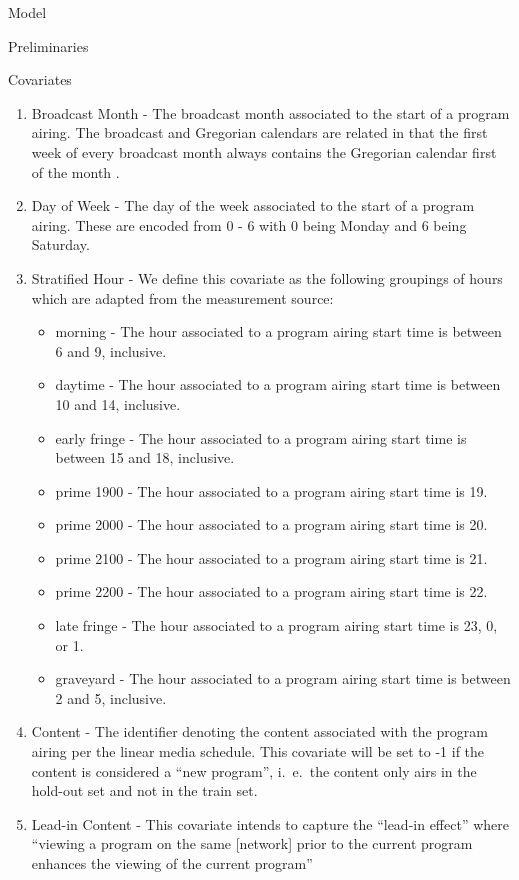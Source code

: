 \begin{chapter}{Model}
\begin{section}{Preliminaries}
\begin{subsection}{Covariates}
    \begin{enumerate}
    \item Broadcast Month - The broadcast month associated to the start of a program airing.
      The broadcast and Gregorian calendars are related in that the first week of every broadcast month always contains the Gregorian calendar first of the month \cite{calendar}.
    \item Day of Week - The day of the week associated to the start of a program airing.
      These are encoded from 0 - 6 with 0 being Monday and 6 being Saturday.
    \item Stratified Hour - We define this covariate as the following groupings of hours which are adapted from the measurement source:
      \begin{itemize}
        \item morning - The hour associated to a program airing start time is between 6 and 9, inclusive.
        \item daytime - The hour associated to a program airing start time is between 10 and 14, inclusive.
        \item early fringe - The hour associated to a program airing start time is between 15 and 18, inclusive.
        \item prime 1900 - The hour associated to a program airing start time is 19.
        \item prime 2000 - The hour associated to a program airing start time is 20.
        \item prime 2100 - The hour associated to a program airing start time is 21.
        \item prime 2200 - The hour associated to a program airing start time is 22.
        \item late fringe - The hour associated to a program airing start time is 23, 0, or 1.
        \item graveyard - The hour associated to a program airing start time is between 2 and 5, inclusive.
      \end{itemize}
    \item Content - The identifier denoting the content associated with the program airing per the linear media schedule.
      This covariate will be set to -1 if the content is considered a ``new program'', i.\ e.\ the content only airs in
      the hold-out set and not in the train set.
    \item Lead-in Content -
      This covariate intends to capture the ``lead-in effect'' where
      ``viewing a program on the same [network] prior to the current program enhances the viewing of the current program''

\end{enumerate}
\end{subsection}
\end{section}
\end{chapter}
